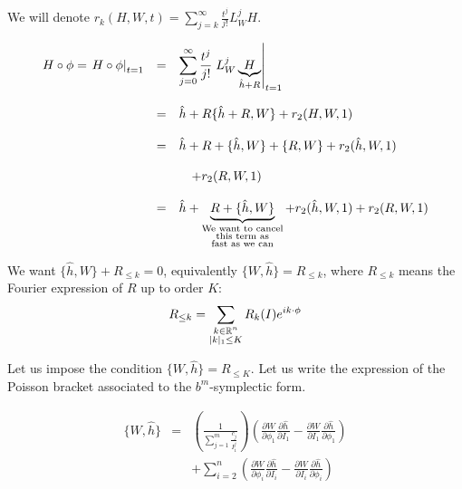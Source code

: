 We will denote $r_k(H,W,t)=\sum_{j=k}^\infty\frac{t^j}{j!}L_W^jH$.

\begin{equation}\label{eq:new_hamiltonian_expression}
\begin{array}{rcl}
\displaystyle{H\circ\phi = \left.H\circ\phi\right|_{t=1}}& = & \displaystyle{\sum_{j=0}^{\infty}\frac{t^j}{j!}\left.L_W^j\underbrace{H}_{\hat{h}+R}\right|_{t=1}}\\
\\
&=& \displaystyle{ \hat{h}+R\{\hat{h}+R,W\}+r_2(H,W,1)}\\
\\
&=& \displaystyle{ \hat{h}+R+\{\hat{h},W\}+\{R,W\}+r_2(\hat{h},W,1)}\\
\\
& & \quad \displaystyle{+r_2(R,W,1)}\\
\\
&=& \displaystyle{ \hat{h}+\underbrace{R+\{\hat{h},W\}}_{\begin{subarray}{c}\text{We want to cancel} \\ \text{this term as} \\ \text{fast as we can}\end{subarray}}+r_2(\hat{h},W,1)+r_2(R,W,1)}
\end{array}
\end{equation}

We want $\{\hat{h},W\}+R_{\leq k} =0$, equivalently $\{W,\hat{h}\}= R_{\leq k} $, where $R_{\leq k} $ means the Fourier expression of $R$ up to order $K$:
$$R_{\leq k} = \sum_{\begin{subarray}{c} k\in\mathbb{R}^n \\ |k|_1 \leq K\end{subarray}} R_k(I)e^{ik\cdot\phi}$$

Let us impose the condition $\{W,\hat{h}\}=R_{\leq K}$. Let us write the expression of the Poisson bracket associated to the $b^m$-symplectic form.

$$
\begin{array}{rcl}
\{W,\hat{h}\} & = & \displaystyle \left(\frac{1}{\sum_{j = 1}^m \frac{c_j}{I_1^j}}\right)\left(\frac{\partial W}{\partial \phi_1}\frac{\partial \hat{h}}{\partial I_1} - \frac{\partial W}{\partial I_1}\frac{\partial \hat{h}}{\partial \phi_1}\right)\\
& & + \displaystyle{\sum_{i = 2}^n \left(\frac{\partial W}{\partial \phi_i}\frac{\partial \hat{h}}{\partial I_i} - \frac{\partial W}{\partial I_i}\frac{\partial \hat{h}}{\partial \phi_i}\right)}
\end{array}
$$

